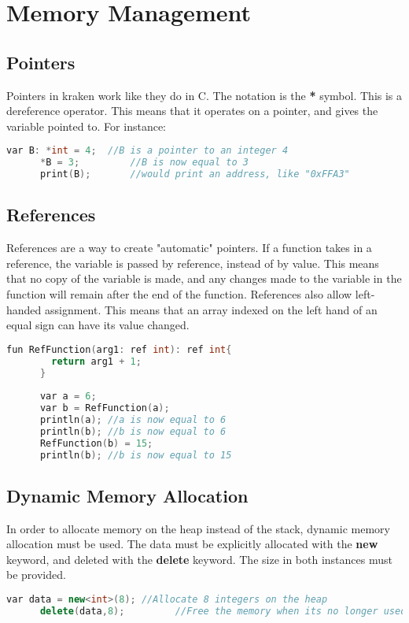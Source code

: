 \documentclass{article}
\begin{document}
\section{Memory Management}
  \subsection{Pointers}
    Pointers in kraken work like they do in C.  The notation is the 
    {\bf{*}} symbol.  This is a dereference operator.  This means that it
    operates on a pointer, and gives the variable pointed to.  For 
    instance:
    \begin{lstlisting}[language=C++]
      var B: *int = 4;  //B is a pointer to an integer 4
      *B = 3;         //B is now equal to 3
      print(B);       //would print an address, like "0xFFA3"
    \end{lstlisting}
  \subsection{References}
    References are a way to create "automatic" pointers.  If a function
  takes in a reference, the variable is passed by reference, instead of by
  value.  This means that no copy of the variable is made, and any changes
  made to the variable in the function will remain after the end of the
  function.  References also allow left-handed assignment.  This means that
  an array indexed on the left hand of an equal sign can have its value
  changed.
    \begin{lstlisting}[language=C++]
      fun RefFunction(arg1: ref int): ref int{
        return arg1 + 1;
      }
      
      var a = 6;
      var b = RefFunction(a);
      println(a); //a is now equal to 6
      println(b); //b is now equal to 6
      RefFunction(b) = 15; 
      println(b); //b is now equal to 15
    \end{lstlisting}
  
  \subsection{Dynamic Memory Allocation} 
    In order to allocate memory on the heap instead of the stack, dynamic
  memory allocation must be used.  The data must be explicitly allocated with
  the {\bf{new}} keyword, and deleted with the {\bf{delete}} keyword.  The
  size in both instances must be provided.
    \begin{lstlisting}[language=C++]
      var data = new<int>(8); //Allocate 8 integers on the heap
      delete(data,8);         //Free the memory when its no longer used.
    \end{lstlisting}
\end{document}

